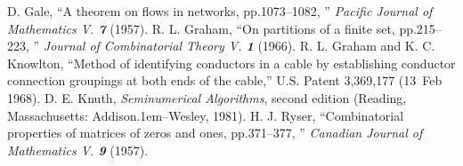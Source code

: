 \documentclass[a4paper,12pt]{article}
\newcommand\AW{Addison\kern.1em--Wesley}
\begin{document}
\bigskip
\begin{thebibliography}{99}
D. Gale, ``A theorem on flows in networks, pp.1073--1082, '' {\sl Pacific Journal of Mathematics\/ V. \bf 7} (1957).
 R. L. Graham, ``On partitions of a finite set, pp.215--223, '' {\sl Journal of Combinatorial Theory\/ V. \bf 1} (1966).
R. L. Graham and K. C. Knowlton, ``Method of identifying conductors in a cable by establishing conductor connection groupings at both ends of the cable,'' U.S. Patent 3,369,177 (13~Feb 1968).
D. E. Knuth, {\sl Seminumerical Algorithms}, second edition (Reading, Massachusetts: \AW, 1981).
 H. J. Ryser, ``Combinatorial properties of matrices of zeros and ones, pp.371--377, ''  {\sl Canadian Journal of Mathematics\/ V. \bf 9} (1957).
\bye
\end{thebibliography}
\end{document}
